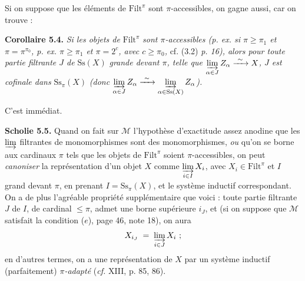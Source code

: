\documentclass[11pt]{article}
\newcommand{\printedpage}[1]{\marginpar{\footnotesize p.~#1}}
\newcommand{\msp}[1]{\marginpar{\footnotesize [#1]}}
\newcommand{\cM}{\mathcal{M}}
\newcommand{\Filt}{\mathrm{Filt}}
\newcommand{\Ss}{\mathrm{Ss}}
\newcommand{\isoto}{\xrightarrow{\ \sim\ }}
\begin{document}
\printedpage{31}

Si on suppose que les éléments de $\Filt^{\pi}$ sont $\pi$-accessibles, on gagne aussi, car on trouve :

\textbf{Corollaire 5.4.} \textit{Si les objets de} $\Filt^{\pi}$ \textit{sont $\pi$-accessibles (p. ex. si $\pi \geq \pi_1$ et $\pi = \pi^{\pi_0}$, p. ex. $\pi \geq \pi_1$ et $\pi = 2^{c}$, avec $c \geq \pi_0$,} cf. (3.2) \textit{p. 16), alors pour toute partie filtrante $J$ de} $\Ss(X)$ \textit{grande devant $\pi$, telle que $\varinjlim\limits_{\alpha\in J} Z_{\alpha} \isoto X$, $J$ est cofinale dans} $\Ss_{\pi}(X)$ \textit{(donc $\varinjlim\limits_{\alpha\in J} Z_{\alpha} \isoto \varinjlim\limits_{\alpha\in\Ss(X)} Z_{\alpha}$).}

C'est immédiat.

\msp{page 49}
\textbf{Scholie 5.5.} Quand on fait sur $\cM$ l'hypothèse d'exactitude assez anodine que les $\varinjlim$ filtrantes de monomorphismes sont des monomorphismes, \textit{ou} qu'on se borne aux cardinaux $\pi$ tels que les objets de $\Filt^{\pi}$ soient $\pi$-accessibles, on peut \textit{canoniser} la représentation d'un objet $X$ comme $\varinjlim\limits_{i\in I} X_i$, avec $X_i \in \Filt^{\pi}$ et $I$ grand devant $\pi$, en prenant $I = \Ss_{\pi}(X)$, et le système inductif correspondant. On a de plus l'agréable propriété supplémentaire que voici : toute partie filtrante $J$ de $I$, de cardinal $\leq \pi$, admet une borne supérieure $i_J$, et (si on suppose que $\cM$ satisfait la condition ($e$), page 46, note 18), on aura
\[
X_{i_J} \;=\; \varinjlim_{i\in J} X_i \ ;
\]
en d'autres termes, on a une représentation de $X$ par un système inductif (parfaitement) \textit{$\pi$-adapté} (\textit{cf.} XIII, p. 85, 86).
\end{document}

